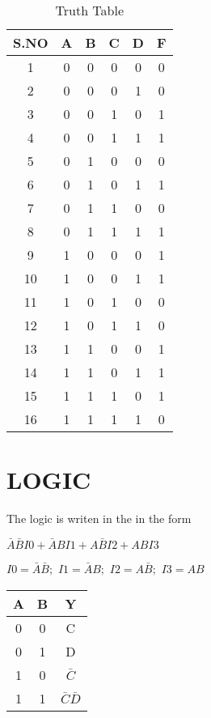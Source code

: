 \documentclass[journal,12pt,twocolumn]{IEEEtran}
\begin{document}
\begin{table}[h]
    \setlength{\arrayrulewidth}{0.1mm}
\setlength{\tabcolsep}{18pt}
    \centering
\begin{tabular}{|c|c|c|c|c|c|}
  \hline
    \textbf S.NO &\textbf A &\textbf B &\textbf C & \textbf D &\textbf F  \\
       \hline
     1&0&0&0&0&0 \\
     \hline
     2&0&0&0&1&0 \\
     \hline
     3&0&0&1&0&1 \\
     \hline
     4&0&0&1&1&1 \\
     \hline
     5&0&1&0&0&0 \\
     \hline
     6&0&1&0&1&1 \\
     \hline
     7&0&1&1&0&0 \\
     \hline
     8&0&1&1&1&1 \\
     \hline
     9&1&0&0&0&1 \\
     \hline
     10&1&0&0&1&1 \\
     \hline
     11&1&0&1&0&0 \\
     \hline
     12&1&0&1&1&0 \\
     \hline
     13&1&1&0&0&1 \\
     \hline
     14&1&1&0&1&1 \\
     \hline
     15&1&1&1&0&1 \\
     \hline
     16&1&1&1&1&0 \\
       \hline
\end{tabular}
\caption{Truth Table}
\end{table}
\bigskip

\section{LOGIC}
The logic is writen in the in the form
\bigskip

$ \bar A \bar B I0 + \bar ABI1 + A \bar B I2 + ABI3 $
\bigskip 

$I0 = \bar A \bar B ;$ 
$I1 = \bar AB ;$
$I2 = A \bar B ;$
$I3 = AB $
\bigskip
\begin{table}[h]
\setlength{\arrayrulewidth}{0.3mm}
\setlength{\tabcolsep}{10pt}
  \centering
\begin{tabular}{|c|c|c|}
\hline
\textbf A& \textbf B& \textbf Y \\
\hline
     0&0&C  \\
\hline
     0&1&D \\
\hline
     1&0&$\bar C $\\
\hline
     1&1&$\bar C \bar D $ \\
\hline
\end{tabular}
\end{table} 
\bigskip
\end{document}
